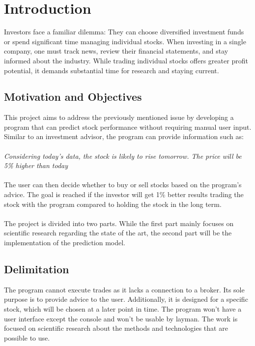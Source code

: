 \section{Introduction} \label{sec: Introduction}
Investors face a familiar dilemma: They can choose diversified investment funds or spend significant time managing individual stocks. When investing in a single company, one must track news, review their financial statements, and stay informed about the industry. While trading individual stocks offers greater profit potential, it demands substantial time for research and staying current.
\subsection{Motivation and Objectives}\label{sec: Motivation and Objectives}
This project aims to address the previously mentioned issue by developing a program that can predict stock performance without requiring manual user input. Similar to an investment advisor, the program can provide information such as:\\
\\
\textit{\grqq Considering today's data, the stock is likely to rise tomorrow. The price will be 5\% higher than today\grqq{}}\\
\\
The user can then decide whether to buy or sell stocks based on the program's advice.
The goal is reached if the investor will get 1\% better results trading the stock with the program compared to holding the stock in the long term.\\
\\
The project is divided into two parts. While the first part mainly focuses on scientific research regarding the state of the art, the second part will be the implementation of the prediction model.
\subsection{Delimitation}\label{sec: Delimitation}
The program cannot execute trades as it lacks a connection to a broker. Its sole purpose is to provide advice to the user. Additionally, it is designed for a specific stock, which will be chosen at a later point in time. The program won't have a user interface except the console and won't be usable by layman. The work is focused on scientific research about the methods and technologies that are possible to use.